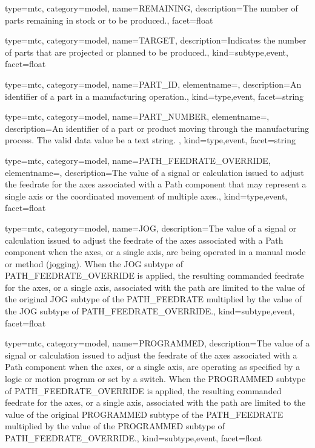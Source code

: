 {
  type=mtc,
  category=model,
  name={REMAINING},
  description={The number of parts remaining in stock or to be produced.},
  facet={\gls{float}}
}


{
  type=mtc,
  category=model,
  name={TARGET},
  description={Indicates the number of parts that are projected or planned to be produced.},
  kind={subtype,event},
  facet={\gls{float}}
}


{
  type=mtc,
  category=model,
  name={PART\_ID},
  elementname=,
  description={An identifier of a part in a manufacturing operation.},
  kind={type,event},
  facet={\gls{string}}
}


{
  type=mtc,
  category=model,
  name={PART\_NUMBER},
  elementname=,
  description={An identifier of a part or product moving through the manufacturing process.  The \gls{valid data value} \must be a text string. },
  kind={type,event},
  facet={\gls{string}}
}


{
  type=mtc,
  category=model,
  name={PATH\_FEEDRATE\_OVERRIDE},
  elementname=,
  description={The value of a signal or calculation issued to adjust the feedrate for the axes associated with a Path component that may represent a single axis or the coordinated movement of multiple axes.},
  kind={type,event},
  facet={\gls{float}}
}


{
  type=mtc,
  category=model,
  name={JOG},
  description={The value of a signal or calculation issued to adjust the feedrate of the axes associated with a Path component when the axes, or a single axis, are being operated in a manual mode or method (jogging).   \newline When the JOG subtype of PATH\_FEEDRATE\_OVERRIDE is applied, the resulting commanded feedrate for the axes, or a single axis, associated with the path are limited to the value of the original JOG subtype of the PATH\_FEEDRATE multiplied by the value of the JOG subtype of PATH\_FEEDRATE\_OVERRIDE.},
  kind={subtype,event},
  facet={\gls{float}}
}


{
  type=mtc,
  category=model,
  name={PROGRAMMED},
  description={The value of a signal or calculation issued to adjust the feedrate of the axes associated with a Path component when the axes, or a single axis, are operating as specified by a logic or motion program or set by a switch. \newline When the PROGRAMMED subtype of PATH\_FEEDRATE\_OVERRIDE is applied, the resulting commanded feedrate for the axes, or a single axis, associated with the path are limited to the value of the original PROGRAMMED subtype of the PATH\_FEEDRATE multiplied by the value of the PROGRAMMED subtype of PATH\_FEEDRATE\_OVERRIDE.},
  kind={subtype,event},
  facet={\gls{float}}
}



